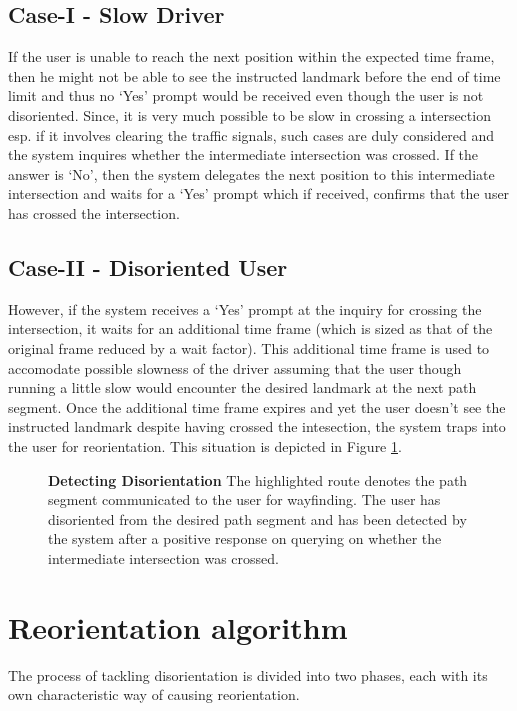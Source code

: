 \documentclass{iitkthesis}
\begin{document}
\subsection*{Case-I - Slow Driver}
If the user is unable to reach the next position within the expected time frame, then he might not be able to see the instructed landmark before the end of time limit and thus no `Yes' prompt would be received even though the user is not disoriented. Since, it is very much possible to be slow in crossing a intersection esp. if it involves clearing the traffic signals, such cases are duly considered and the system inquires whether the intermediate intersection was crossed. If the answer is `No', then the system delegates the next position to this intermediate intersection and waits for a `Yes' prompt which if received, confirms that the user has crossed the intersection. 

\subsection*{Case-II - Disoriented User}
However, if the system receives a `Yes' prompt at the inquiry for crossing the intersection, it waits for an additional time frame (which is sized as that of the original frame reduced by a wait factor). This additional time frame is used to accomodate possible slowness of the driver assuming that the user though running a little slow would encounter the desired landmark at the next path segment. Once the additional time frame expires and yet the user doesn't see the instructed landmark despite having crossed the intesection, the system traps into the user for reorientation. This situation is depicted in Figure \ref{fig:detect}. 
\begin{figure}
\centering
{}
\caption{\textbf{Detecting Disorientation} The highlighted route denotes the path segment communicated to the user for wayfinding. The user has disoriented from the desired path segment and has been detected by the system after a positive response on querying on whether the intermediate intersection was crossed.}
\label{fig:detect}
 \end{figure}
\section{Reorientation algorithm}
The process of tackling disorientation is divided into two phases, each with its own characteristic way of causing reorientation. 
\end{document}

